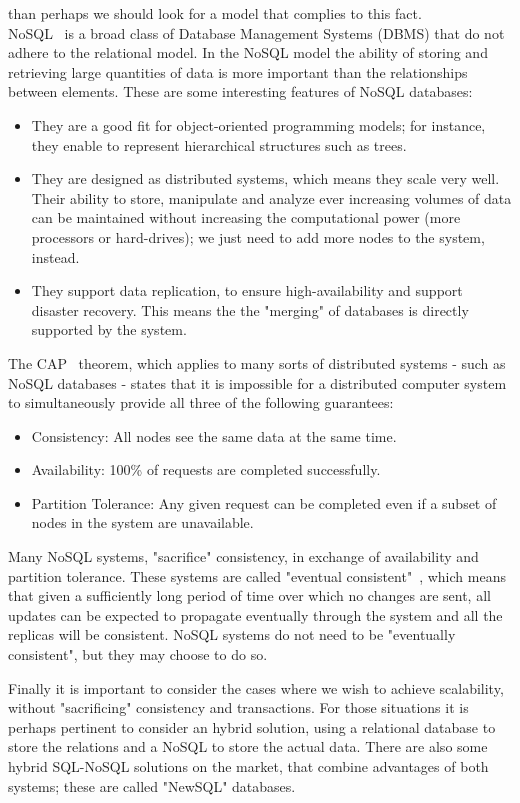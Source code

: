 \documentclass[11pt]{article} %
\begin{document}
than perhaps we should look for a model that complies to this fact.\\
NoSQL~\cite{nosql} is a broad class of Database Management Systems (DBMS) that do not adhere to the relational model. In the NoSQL model the ability of storing and retrieving large quantities of data is more important than the relationships between elements. These are some interesting features of NoSQL databases:
\begin{itemize}
\item They are a good fit for object-oriented programming models; for instance, they enable to represent hierarchical structures such as trees.
\item They are designed as distributed systems, which means they scale very well. Their ability to store, manipulate and analyze ever increasing volumes of data can be maintained without increasing the computational power (more processors or hard-drives); we just need to add more nodes to the system, instead. 
\item They support data replication, to ensure high-availability and support disaster recovery. This means the the "merging" of databases is directly supported by the system.
\end{itemize}
The CAP~\cite{cap} theorem, which applies to many sorts of distributed systems - such as NoSQL databases - states that it is impossible for a distributed computer system to simultaneously provide all three of the following guarantees:
\begin{itemize}
\item Consistency: All nodes see the same data at the same time.
\item Availability: 100\% of requests are completed successfully.
\item Partition Tolerance: Any given request can be completed even if a subset of nodes in the system are unavailable.
\end{itemize}
Many NoSQL systems, "sacrifice" consistency, in exchange of availability and partition tolerance. These systems are called "eventual consistent"~\cite{consistency}, which means that given a sufficiently long period of time over which no changes are sent, all updates can be expected to propagate eventually through the system and all the replicas will be consistent. NoSQL systems do not need to be "eventually consistent", but they may choose to do so.

Finally it is important to consider the cases where we wish to achieve scalability, without "sacrificing" consistency and transactions. For those situations it is perhaps pertinent to consider an hybrid solution, using a relational database to store the relations and a NoSQL to store the actual data. There are also some hybrid SQL-NoSQL solutions on the market, that combine advantages of both systems; these are called "NewSQL" databases.
\end{document}
